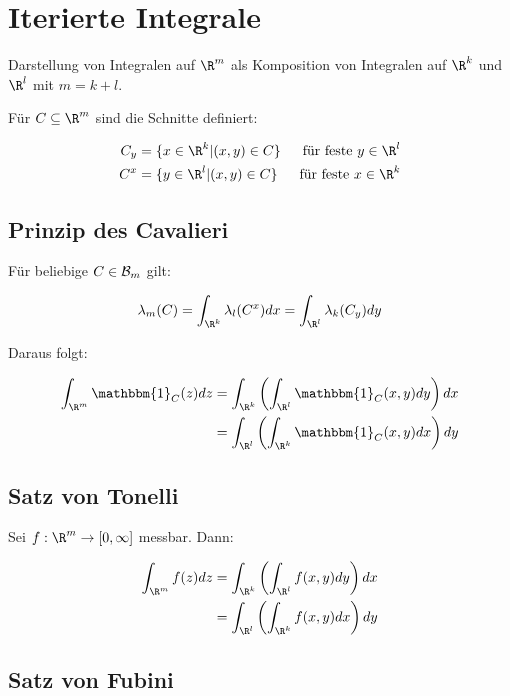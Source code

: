 \section*{Iterierte Integrale}

Darstellung von Integralen auf $\R^m$ als Komposition von Integralen auf $\R^k$ und $\R^l$ mit $m = k + l$.

Für $C \subseteq \R^m$ sind die Schnitte definiert:

\vspace{-4mm}
\begin{align*}
	C_y &= \{ x \in \R^k | (x,y) \in C \} &\text{ für feste } y \in \R^l\\
	C^x &= \{ y \in \R^l | (x,y) \in C \} &\text{ für feste } x \in \R^k
\end{align*}

\subsection*{Prinzip des Cavalieri}

Für beliebige $C \in \mathcal{B}_m$ gilt:

$$\lambda_m(C) = \int_{\R^k} \lambda_l(C^x) dx = \int_{\R^l} \lambda_k(C_y) dy$$

Daraus folgt:

\vspace{-4mm}
\begin{align*}
\int_{\R^m} \mathbbm{1}_C(z) dz &= \int_{\R^k} \left( \int_{\R^l} \mathbbm{1}_C(x,y) dy \right) dx\\
                         &= \int_{\R^l} \left( \int_{\R^k} \mathbbm{1}_C(x,y) dx \right) dy
\end{align*}

\subsection*{Satz von Tonelli}

Sei $f : \R^m \to [0,\infty]$ messbar. Dann:

\vspace{-4mm}
\begin{align*}
	\int_{\R^m} f(z) dz &= \int_{\R^k} \left( \int_{\R^l} f(x,y) dy \right) dx\\
	             &= \int_{\R^l} \left( \int_{\R^k} f(x,y) dx \right) dy
\end{align*}

\subsection*{Satz von Fubini}

